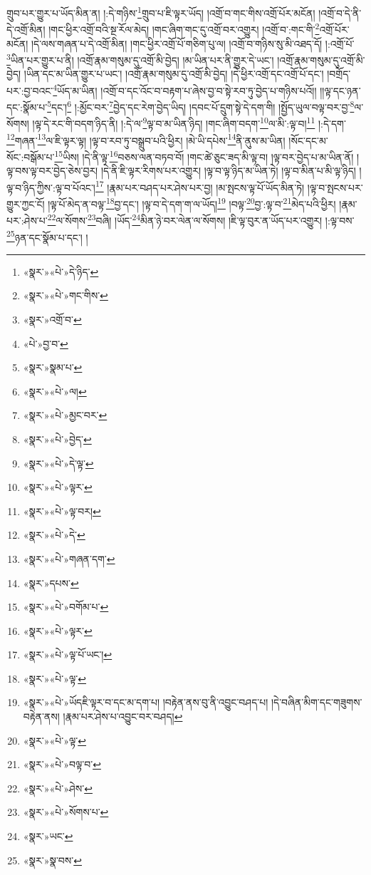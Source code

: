 གྲུབ་པར་གྱུར་པ་ཡོད་མིན་ན། །:དེ་གཉིས་\footnote{«སྣར་»«པེ་»དེ་ཉིད་}གྲུབ་པ་ཇི་ལྟར་ཡོད། །འགྲོ་བ་གང་གིས་འགྲོ་པོར་མངོན། །འགྲོ་བ་དེ་ནི་དེ་འགྲོ་མིན། །གང་ཕྱིར་འགྲོ་བའི་སྔ་རོལ་མེད། །གང་ཞིག་གང་དུ་འགྲོ་བར་འགྱུར། །འགྲོ་བ་:གང་གི་\footnote{«སྣར་»«པེ་»གང་གིས་}འགྲོ་པོར་མངོན། །དེ་ལས་གཞན་པ་དེ་འགྲོ་མིན། །གང་ཕྱིར་འགྲོ་པོ་གཅིག་པུ་ལ། །འགྲོ་བ་གཉིས་སུ་མི་འཐད་དོ། །:འགྲོ་པོ་\footnote{«སྣར་»འགྲོ་བ་}ཡིན་པར་གྱུར་པ་ནི། །འགྲོ་རྣམ་གསུམ་དུ་འགྲོ་མི་བྱེད། །མ་ཡིན་པར་ནི་གྱུར་དེ་ཡང་། །འགྲོ་རྣམ་གསུམ་དུ་འགྲོ་མི་བྱེད། །ཡིན་དང་མ་ཡིན་གྱུར་པ་ཡང་། །འགྲོ་རྣམ་གསུམ་དུ་འགྲོ་མི་བྱེད། །དེ་ཕྱིར་འགྲོ་དང་འགྲོ་པོ་དང་། །བགྲོད་པར་:བྱ་བའང་\footnote{«པེ་»བྱ་བ་}ཡོད་མ་ཡིན། །འགྲོ་བ་དང་འོང་བ་བརྟག་པ་ཞེས་བྱ་བ་སྟེ་རབ་ཏུ་བྱེད་པ་གཉིས་པའོ།། །།ལྟ་དང་ཉན་དང་:སྣོམ་པ་\footnote{«སྣར་»སྣམ་པ་}དང་།\footnote{«སྣར་»«པེ་»ལ།} །:མྱོང་བར་\footnote{«སྣར་»«པེ་»མྱང་བར་}བྱེད་དང་རེག་བྱེད་ཡིད། །དབང་པོ་དྲུག་སྟེ་དེ་དག་གི། །སྤྱོད་ཡུལ་བལྟ་བར་བྱ་\footnote{«སྣར་»«པེ་»བྱེད་}ལ་སོགས། །ལྟ་དེ་རང་གི་བདག་ཉིད་ནི། །:དེ་ལ་\footnote{«སྣར་»«པེ་»དེ་ལྟ་}ལྟ་བ་མ་ཡིན་ཉིད། །གང་ཞིག་བདག་\footnote{«སྣར་»«པེ་»ལྟར་}ལ་མི་:ལྟ་བ།\footnote{«སྣར་»«པེ་»ལྟ་བར།} །:དེ་དག་\footnote{«སྣར་»«པེ་»དེ་}གཞན་\footnote{«སྣར་»«པེ་»གཞན་དག་}ལ་ཇི་ལྟར་ལྟ། །ལྟ་བ་རབ་ཏུ་བསྒྲུབ་པའི་ཕྱིར། །མེ་ཡི་དཔེས་\footnote{«སྣར་»དཔས་}ནི་ནུས་མ་ཡིན། །སོང་དང་མ་སོང་:བསྒོམ་པ་\footnote{«སྣར་»«པེ་»བགོམ་པ་}ཡིས། །དེ་ནི་ལྟ་\footnote{«སྣར་»«པེ་»ལྟར་}བཅས་ལན་བཏབ་བོ། །གང་ཚེ་ཅུང་ཟད་མི་ལྟ་བ། །ལྟ་བར་བྱེད་པ་མ་ཡིན་ནོ། །ལྟ་བས་ལྟ་བར་བྱེད་ཅེས་བྱར། །དེ་ནི་ཇི་ལྟར་རིགས་པར་འགྱུར། །ལྟ་བ་ལྟ་ཉིད་མ་ཡིན་ཏེ། །ལྟ་བ་མིན་པ་མི་ལྟ་ཉིད། །ལྟ་བ་ཉིད་ཀྱིས་:ལྟ་བ་པོའང་།\footnote{«སྣར་»«པེ་»ལྟ་པོ་ཡང་།} །རྣམ་པར་བཤད་པར་ཤེས་པར་བྱ། །མ་སྤངས་ལྟ་པོ་ཡོད་མིན་ཏེ། །ལྟ་བ་སྤངས་པར་གྱུར་ཀྱང་ངོ། །ལྟ་པོ་མེད་ན་བལྟ་\footnote{«སྣར་»«པེ་»ལྟ་}བྱ་དང་། །ལྟ་བ་དེ་དག་ག་ལ་ཡོད།\footnote{«སྣར་»«པེ་»ཡོདཇི་ལྟར་བ་དང་མ་དག་པ། །བརྟེན་ནས་བུ་ནི་འབྱུང་བཤད་པ། །དེ་བཞིན་མིག་དང་གཟུགས་བརྟེན་ནས། །རྣམ་པར་ཤེས་པ་འབྱུང་བར་བཤད།} །བལྟ་\footnote{«སྣར་»«པེ་»ལྟ་}བྱ་:ལྟ་བ་\footnote{«སྣར་»«པེ་»བལྟ་བ་}མེད་པའི་ཕྱིར། །རྣམ་པར་:ཤེས་པ་\footnote{«སྣར་»«པེ་»ཤེས་}ལ་སོགས་\footnote{«སྣར་»«པེ་»སོགས་པ་}བཞི། །ཡོད་\footnote{«སྣར་»ཡང་}མིན་ཉེ་བར་ལེན་ལ་སོགས། །ཇི་ལྟ་བུར་ན་ཡོད་པར་འགྱུར། །:ལྟ་བས་\footnote{«སྣར་»སྣ་བས་}ཉན་དང་སྣོམ་པ་དང་། །
